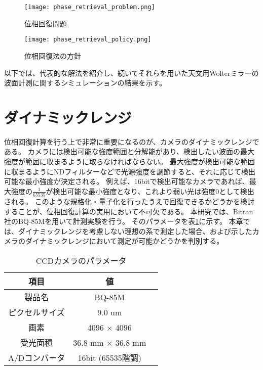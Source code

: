\begin{figure}[!ht]
\centering
\texttt{[image: phase\_retrieval\_problem.png]}
\caption{位相回復問題}
\label{fig:phase_retrieval_problem}
\end{figure}

\begin{figure}[!ht]
\centering
\texttt{[image: phase\_retrieval\_policy.png]}
\caption{位相回復法の方針}
\label{fig:phase_retrieval_policy}
\end{figure}

以下では、代表的な解法を紹介し、続いてそれらを用いた天文用Wolterミラーの波面計測に関するシミュレーションの結果を示す。


\clearpage
\newpage

\section{ダイナミックレンジ}
位相回復計算を行う上で非常に重要になるのが、カメラのダイナミックレンジである。
カメラには検出可能な強度範囲と分解能があり、検出したい波面の最大強度が範囲に収まるように取らなければならない。
最大強度が検出可能な範囲に収まるようにNDフィルターなどで光源強度を調節すると、それに応じて検出可能な最小強度が決定される。
例えば、16bitで検出可能なカメラであれば、最大強度の$\frac{1}{65535}$が検出可能な最小強度となり、これより弱い光は強度0として検出される。
このような規格化・量子化を行ったうえで回復できるかどうかを検討することが、位相回復計算の実用において不可欠である。
本研究では、Bitran社のBQ-85Mを用いて計測実験を行う。
そのパラメータを表\ref{tb:ccd_camera_params}に示す。
本章では、ダイナミックレンジを考慮しない理想の系で測定した場合、および示したカメラのダイナミックレンジにおいて測定が可能かどうかを判別する。

\begin{table}
\begin{center}
  \begin{tabular}{|c|c|l|} \hline
    項目 & 値 \\ \hline
    製品名 & BQ-85M \\
    ピクセルサイズ & 9.0 um \\
    画素 & 4096 $\times$ 4096 \\
    受光面積 & 36.8 mm $\times$ 36.8 mm \\
    A/Dコンバータ & 16bit (65535階調) \\ \hline
  \end{tabular}
  \caption{CCDカメラのパラメータ}
  \label{tb:ccd_camera_params}
\end{center}
\end{table}



